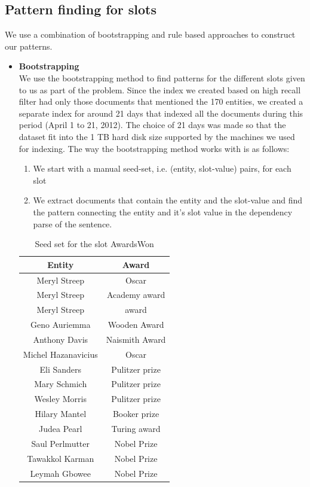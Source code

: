 \subsection{Pattern finding for slots}
We use a combination of bootstrapping and rule based approaches to construct our patterns.
\begin{itemize}[label={}]
\item \textbf{Bootstrapping} \\
We use the bootstrapping method to find patterns for the different slots given to us as part of the problem. Since the index we created based on high recall filter had only those documents that mentioned the 170 entities, we created a separate index for around 21 days that indexed all the documents during this period (April 1 to 21, 2012). The choice of 21 days was made so that the dataset fit into the 1 TB hard disk size supported by the machines we used for indexing. The way the bootstrapping method works with is as follows:
\begin{enumerate}
\item We start with a manual seed-set, i.e. (entity, slot-value) pairs, for each slot
\item We extract documents that contain the entity and the slot-value and find the pattern connecting the entity and it’s slot value in the dependency parse of the sentence. 
\end{enumerate}

\begin{table}[!ht]
\centering
\begin{tabular}{|c|c|}
\hline
Entity & Award \\
\hline
Meryl Streep & Oscar \\
Meryl Streep & Academy award \\
Meryl Streep & award \\
Geno Auriemma & Wooden Award \\
Anthony Davis & Naismith Award \\
Michel Hazanavicius & Oscar \\
Eli Sanders & Pulitzer prize \\ 
Mary Schmich & Pulitzer prize \\
Wesley Morris & Pulitzer prize \\
Hilary Mantel & Booker prize \\
Judea Pearl & Turing award \\
Saul Perlmutter & Nobel Prize \\
Tawakkol Karman & Nobel Prize \\ 
Leymah Gbowee & Nobel Prize \\
\hline
\end{tabular}
\caption{Seed set for the slot AwardsWon}
\label{tab:seedset_awardsWon}
\end{table}


\end{itemize}
